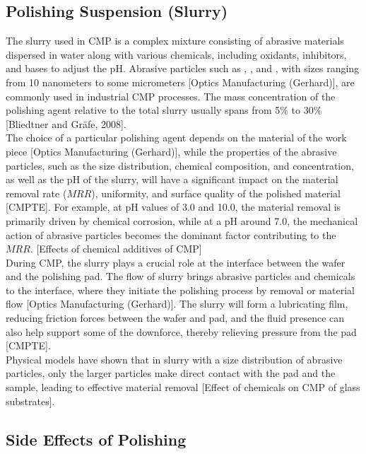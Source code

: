 \subsection{Polishing Suspension (Slurry)}
\label{subsec:polishing_slurry}

The slurry used in CMP is a complex mixture consisting of abrasive materials dispersed in water along with various chemicals, including oxidants, inhibitors, and bases to adjust the pH. Abrasive particles such as , , and , with sizes ranging from 10 nanometers to some micrometers [Optics Manufacturing (Gerhard)], are commonly used in industrial CMP processes. The mass concentration of the polishing agent relative to the total slurry usually spans from 5\% to 30\% [Bliedtner and Gräfe, 2008].
\\
The choice of a particular polishing agent depends on the material of the work piece [Optics Manufacturing (Gerhard)], while the properties of the abrasive particles, such as the size distribution, chemical composition, and concentration, as well as the pH of the slurry, will have a significant impact on the material removal rate ($MRR$), uniformity, and surface quality of the polished material [CMPTE]. For example, at pH values of 3.0 and 10.0, the material removal is primarily driven by chemical corrosion, while at a pH around 7.0, the mechanical action of abrasive particles becomes the dominant factor contributing to the $MRR$. [Effects of chemical additives of CMP]
\\
During CMP, the slurry plays a crucial role at the interface between the wafer and the polishing pad. The flow of slurry brings abrasive particles and chemicals to the interface, where they initiate the polishing process by removal or material flow [Optics Manufacturing (Gerhard)]. The slurry will form a lubricating film, reducing friction forces between the wafer and pad, and the fluid presence can also help support some of the downforce, thereby relieving pressure from the pad [CMPTE].
\\
Physical models have shown that in slurry with a size distribution of abrasive particles, only the larger particles make direct contact with the pad and the sample, leading to effective material removal [Effect of chemicals on CMP of glass substrates]. 

\subsection{Side Effects of Polishing}
\label{subsec:polishing_side_eff}

